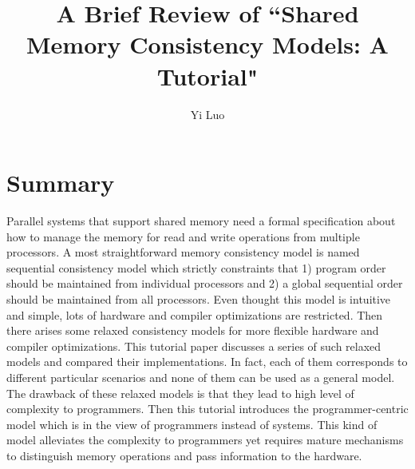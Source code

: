 \documentclass[10pt, letterpaper]{article}
\title{A Brief Review of ``Shared Memory Consistency Models: A Tutorial"}
\author{Yi Luo}
\date{} %
\begin{document}
\maketitle

\section{Summary}
\label{sec-summary}
Parallel systems that support shared memory need a formal specification about how to manage the memory for read and write operations from multiple processors. A most straightforward memory consistency model is named sequential consistency model which strictly constraints that 1) program order should be maintained from individual processors and 2) a global sequential order should be maintained from all processors. Even thought this model is intuitive and simple, lots of hardware and compiler optimizations are restricted. Then there arises some relaxed consistency models for more flexible hardware and compiler optimizations. This tutorial paper discusses a series of such relaxed models and compared their implementations. In fact, each of them corresponds to  different particular scenarios and none of them can be used as a general model. The drawback of these relaxed models is that they lead to high level of complexity to programmers. Then this tutorial introduces the programmer-centric model which is in the view of programmers instead of systems. This kind of model alleviates the complexity to programmers yet requires mature mechanisms to distinguish memory operations and pass information to the hardware. ~\cite{saritaSMCM1995}
\end{document}
